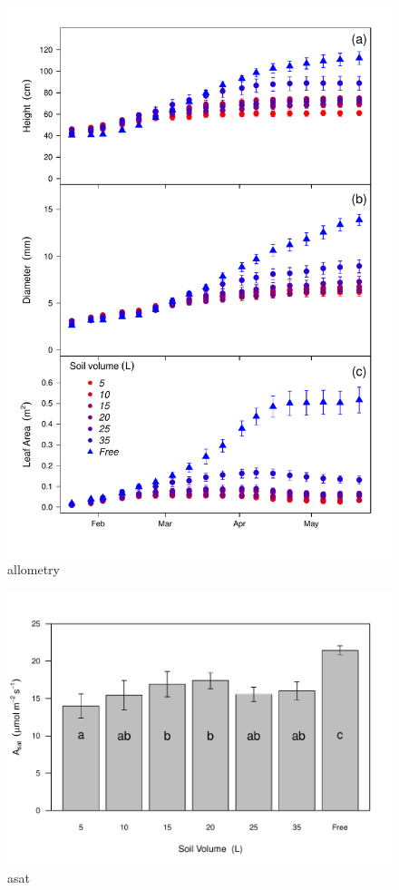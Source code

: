 \documentclass[a4paper]{article}\usepackage[]{graphicx}\usepackage[]{color}
\begin{document}
\begin{figure}[h!]
    \centering
    \includegraphics{allometry.pdf}
    \caption{allometry}
    \label{fig:figure2}
\end{figure}

\begin{figure}[h!]
    \centering
    \includegraphics{Asat.pdf}
    \caption{asat}
    \label{fig:figure3}
\end{figure}
\end{document}
